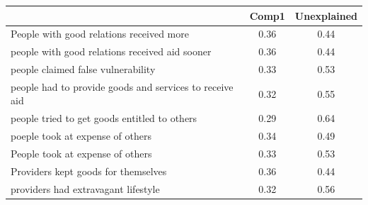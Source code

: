 {
\def\sym#1{\ifmmode^{#1}\else\(^{#1}\)\fi}
\begin{tabular}{l*{1}{cc}}
\toprule
                    &       Comp1& Unexplained\\
\midrule
People with good relations received more&        0.36&        0.44\\
people with good relations received aid sooner&        0.36&        0.44\\
people claimed false vulnerability&        0.33&        0.53\\
people had to provide goods and services to receive aid&        0.32&        0.55\\
people tried to get goods entitled to others&        0.29&        0.64\\
poeple took at expense of others&        0.34&        0.49\\
People took at expense of others&        0.33&        0.53\\
Providers kept goods for themselves&        0.36&        0.44\\
providers had extravagant lifestyle&        0.32&        0.56\\
\bottomrule
\end{tabular}
}
